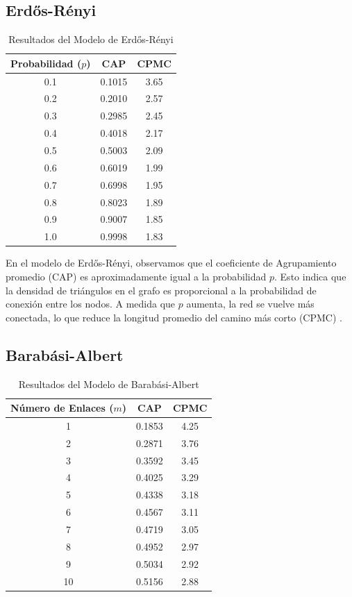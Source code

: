 \subsection{Erdős-Rényi}
\begin{table}[h!]
\centering
\begin{tabular}{ccc}
\toprule
Probabilidad ($p$) & CAP & CPMC \\
\midrule
0.1 & 0.1015 & 3.65 \\
0.2 & 0.2010 & 2.57 \\
0.3 & 0.2985 & 2.45 \\
0.4 & 0.4018 & 2.17 \\
0.5 & 0.5003 & 2.09 \\
0.6 & 0.6019 & 1.99 \\
0.7 & 0.6998 & 1.95 \\
0.8 & 0.8023 & 1.89 \\
0.9 & 0.9007 & 1.85 \\
1.0 & 0.9998 & 1.83 \\
\bottomrule
\end{tabular}
\caption{Resultados del Modelo de Erdős-Rényi}
\label{tab:erdos-renyi}
\end{table}

En el modelo de Erdős-Rényi, observamos que el coeficiente de Agrupamiento promedio (CAP) es aproximadamente igual a la probabilidad $p$. Esto indica que la densidad de triángulos en el grafo es proporcional a la probabilidad de conexión entre los nodos. A medida que $p$ aumenta, la red se vuelve más conectada, lo que reduce la longitud promedio del camino más corto (CPMC) .

\subsection{Barabási-Albert}

\begin{table}[h!]
\centering
\begin{tabular}{ccc}
\toprule
Número de Enlaces ($m$) & CAP & CPMC \\
\midrule
1 & 0.1853 & 4.25 \\
2 & 0.2871 & 3.76 \\
3 & 0.3592 & 3.45 \\
4 & 0.4025 & 3.29 \\
5 & 0.4338 & 3.18 \\
6 & 0.4567 & 3.11 \\
7 & 0.4719 & 3.05 \\
8 & 0.4952 & 2.97 \\
9 & 0.5034 & 2.92 \\
10 & 0.5156 & 2.88 \\
\bottomrule
\end{tabular}
\caption{Resultados del Modelo de Barabási-Albert}
\label{tab:barabasi-albert}
\end{table}

